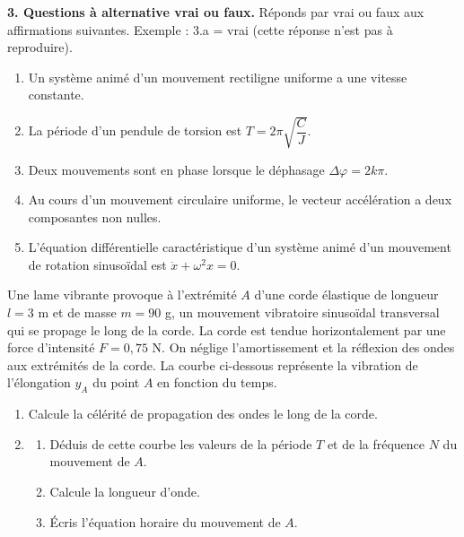 \documentclass[11pt]{article}
\begin{document}
\medskip
\noindent\textbf{3. Questions à alternative vrai ou faux.} Réponds par vrai ou faux aux affirmations suivantes. Exemple : 3.a = vrai (cette réponse n'est pas à reproduire).
\begin{enumerate}[label=\alph*.]
  \item Un système animé d'un mouvement rectiligne uniforme a une vitesse constante.
  \item La période d'un pendule de torsion est $T = 2\pi\sqrt{\dfrac{C}{J}}$.
  \item Deux mouvements sont en phase lorsque le déphasage $\Delta\varphi = 2k\pi$.
  \item Au cours d'un mouvement circulaire uniforme, le vecteur accélération a deux composantes non nulles.
  \item L'équation différentielle caractéristique d'un système animé d'un mouvement de rotation sinusoïdal est $\ddot{x} + \omega^2 x = 0$.
\end{enumerate}

Une lame vibrante provoque à l'extrémité $A$ d'une corde élastique de longueur $l = 3$ m et de masse $m = 90$ g, un mouvement vibratoire sinusoïdal transversal qui se propage le long de la corde. La corde est tendue horizontalement par une force d'intensité $F = 0{,}75$ N. On néglige l'amortissement et la réflexion des ondes aux extrémités de la corde. La courbe ci-dessous représente la vibration de l'élongation $y_A$ du point $A$ en fonction du temps.

\begin{center}
\end{center}

\begin{enumerate}
  \item Calcule la célérité de propagation des ondes le long de la corde.
  \item \begin{enumerate}[label=\alph*.]
    \item Déduis de cette courbe les valeurs de la période $T$ et de la fréquence $N$ du mouvement de $A$.
    \item Calcule la longueur d'onde.
    \item Écris l'équation horaire du mouvement de $A$.
  \end{enumerate}
\end{enumerate}
\end{document}
